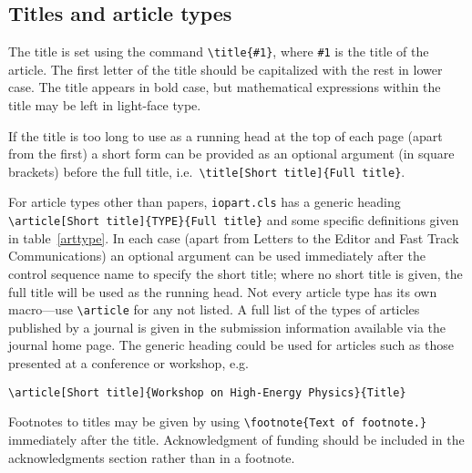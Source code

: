 \documentclass[12pt]{iopart}
\begin{document}
\subsection{Titles and article types}
The title is set using the command
\verb"\title{#1}", where \verb"#1" is the title of the article. The
first letter 
of the title should be capitalized with the rest in lower case. 
The title appears in bold case, but mathematical expressions within the title may be left in light-face type. 

If the title is too long to use as a running head at the top of each page (apart from the
first) a short
form can be provided as an optional argument (in square brackets)
before the full title, i.e.\ \verb"\title[Short title]{Full title}".

For article types other than papers, \verb"iopart.cls"
has a generic heading \verb"\article[Short title]{TYPE}{Full title}" 
and some specific definitions given in table~\ref{arttype}. In each case (apart from Letters
to the Editor and Fast Track Communications) an 
optional argument can be used immediately after the control sequence name
to specify the short title; where no short title is given, the full title
will be used as the running head.  Not every article type has its own macro---use \verb"\article" for
any not listed.  A full list of the types of articles published by a journal is given
in the submission information available via the journal home page.
The generic heading could be used for 
articles such as those presented at a conference or workshop, e.g.
\small\begin{verbatim}
\article[Short title]{Workshop on High-Energy Physics}{Title}
\end{verbatim}\normalsize
Footnotes to titles may be given by using \verb"\footnote{Text of footnote.}" immediately after the title.
Acknowledgment of funding should be included in the acknowledgments section rather than in a footnote.
\end{document}
